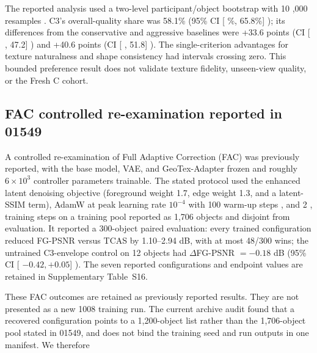 \documentclass[times,twocolumn,final]{elsarticle}
\providecommand{\DIFadd}[1]{{\protect\color{blue} \sf #1}} %
\providecommand{\DIFaddbegin}{} %
\providecommand{\DIFaddend}{} %
\begin{document}
The  
 \DIFaddbegin \DIFadd{reported analysis used }\DIFaddend a two-level   \DIFaddbegin \DIFadd{participant/object bootstrap with }\DIFaddend 10  \DIFaddbegin \DIFadd{,}\DIFaddend 000 resamples  . C3's overall-quality share   \DIFaddbegin \DIFadd{was }\DIFaddend 58.1\% (95\% CI   \DIFaddbegin [\DIFadd{50.1\%, 65.8\%}]\DIFadd{); its differences from }\DIFaddend the conservative and aggressive baselines   \DIFaddbegin \DIFadd{were +33.6 points (CI }[\DIFadd{19.3, 47.2}]\DIFadd{) and +40.6 }\DIFaddend points (CI   \DIFaddbegin [\DIFadd{29.4, 51.8}]\DIFadd{). The }\DIFaddend single-criterion advantages   \DIFaddbegin \DIFadd{for texture naturalness and shape consistency had intervals crossing zero. This bounded preference result does not validate texture fidelity, unseen-view quality, or the Fresh C cohort}\DIFaddend .

  \DIFaddbegin \subsection{FAC controlled re-examination reported in 01549}
\label{subsec:facreported}
\DIFaddend 

  \DIFaddbegin \DIFadd{A controlled re-examination of Full Adaptive Correction (FAC) was previously reported, with the }\DIFaddend base model, VAE, and GeoTex-Adapter   \DIFaddbegin \DIFadd{frozen and roughly $6\times10^3$ controller parameters trainable. The stated protocol used the enhanced latent denoising objective (foreground weight 1.7, edge weight 1.3, and }\DIFaddend a latent-SSIM   \DIFaddbegin \DIFadd{term), AdamW at }\DIFaddend peak learning rate $10^{-4}$   \DIFaddbegin \DIFadd{with }\DIFaddend 100 warm-up steps  \DIFaddbegin \DIFadd{, and }\DIFaddend 2  , 
 \DIFaddbegin \DIFadd{000 training steps on a training pool reported as 1,706 objects and disjoint from evaluation. It reported a 300-object paired evaluation: every trained configuration reduced }\DIFaddend FG-PSNR   \DIFaddbegin \DIFadd{versus TCAS by 1.10--2.94 dB, with at most 48/300 wins; the untrained C3-envelope control on 12 objects had $\Delta$}\DIFaddend FG-PSNR   \DIFaddbegin \DIFadd{$=-0.18$ dB (}\DIFaddend 95\% CI   \DIFaddbegin [\DIFadd{$-0.42,+0.05$}]\DIFadd{). The seven reported configurations and endpoint values are retained in Supplementary Table~S16}\DIFaddend .

  \DIFaddbegin \DIFadd{These FAC outcomes are retained as previously reported results. They are not presented as a new 1008 training run. The current archive audit found that a recovered configuration points to a 1,200-object list rather than the 1,706-object pool stated in 01549, and does not bind the training seed and run outputs in one manifest}\DIFaddend . We therefore  
\end{document}
